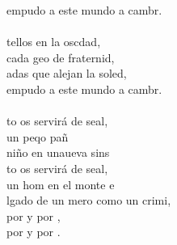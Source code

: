 \begin{cancion}
	empudo a este mundo a cambr.\\
	\jump\\
	tellos en la oscdad,\\
	cada geo de fraternid,\\
	adas que alejan la soled,\\
	empudo a este mundo a cambr.\\
	\jump\\
	to os servirá de seal, \\
	un peqo pañ  \\
	niño en unaueva sins\\
	to os servirá de seal, \\
	un hom en el monte e \\
	lgado de un mero como un crimi,\\
	por  y por , \\
	por  y por .  \\
\end{cancion}%
